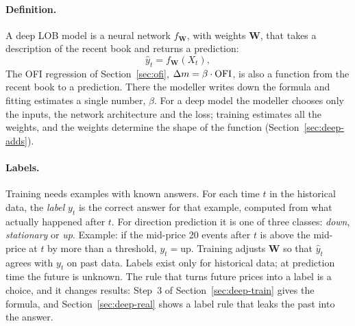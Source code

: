 \paragraph{Definition.} A deep LOB model is a neural network $f_{\mathbf{W}}$, with weights
$\mathbf{W}$, that takes a description of the recent book and returns a prediction:
\begin{equation}
\hat y_t = f_{\mathbf{W}}(X_t),
\label{eq:deep-f}
\end{equation}
The OFI regression of Section~\ref{sec:ofi}, $\Delta m = \beta \cdot \mathrm{OFI}$, is also a function from the recent book to
a prediction. There the modeller writes down the formula and fitting estimates a single number, $\beta$. For a deep
model the modeller chooses only the inputs, the network architecture and the loss; training estimates all the weights,
and the weights determine the shape of the function (Section~\ref{sec:deep-adds}).

\paragraph{Labels.} Training needs examples with known answers. For each time $t$ in the historical data, the
\emph{label} $y_t$ is the correct answer for that example, computed from what actually happened after $t$. For
direction prediction it is one of three classes: \emph{down}, \emph{stationary} or \emph{up}. Example: if the
mid-price 20 events after $t$ is above the mid-price at $t$ by more than a threshold, $y_t = \text{up}$. Training
adjusts $\mathbf{W}$ so that $\hat y_t$ agrees with $y_t$ on past data. Labels exist only for historical data;
at prediction time the future is unknown. The rule that turns future prices into a label is a choice, and it
changes results: Step~3 of Section~\ref{sec:deep-train} gives the formula, and Section~\ref{sec:deep-real} shows a
label rule that leaks the past into the answer.

